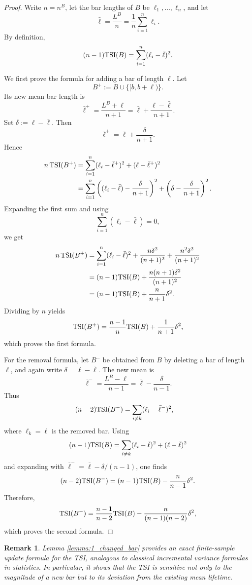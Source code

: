 \documentclass[11pt]{amsart}
\newtheorem*{remark}{Remark}
\theoremstyle{definition}
\newcommand{\tsi}[0]{\textup{TSI}}
\begin{document}
\begin{proof}
Write $n=n^B$, let the bar lengths of $B$ be $\ell_1,\dots,\ell_n$, and let
\[
\bar{\ell}=\frac{L^B}{n}=\frac{1}{n}\sum_{i=1}^n \ell_i.
\]
By definition,
\[
(n-1)\tsi(B)=\sum_{i=1}^n (\ell_i-\bar{\ell})^2.
\]

We first prove the formula for adding a bar of length $\ell$.
Let
\[
B^+:=B\cup\{[b,b+\ell)\}.
\]
Its new mean bar length is
\[
\bar{\ell}^+=\frac{L^B+\ell}{n+1}
=\bar{\ell}+\frac{\ell-\bar{\ell}}{n+1}.
\]
Set $\delta:=\ell-\bar{\ell}$. Then
\[
\bar{\ell}^+=\bar{\ell}+\frac{\delta}{n+1}.
\]
Hence
\begin{align*}
n\,\tsi(B^+)
&=\sum_{i=1}^n (\ell_i-\bar{\ell}^+)^2+(\ell-\bar{\ell}^+)^2\\
&=\sum_{i=1}^n \left((\ell_i-\bar{\ell})-\frac{\delta}{n+1}\right)^2
+\left(\delta-\frac{\delta}{n+1}\right)^2.
\end{align*}
Expanding the first sum and using
\[
\sum_{i=1}^n (\ell_i-\bar{\ell})=0,
\]
we get
\begin{align*}
n\,\tsi(B^+)
&=\sum_{i=1}^n (\ell_i-\bar{\ell})^2
+\frac{n\delta^2}{(n+1)^2}
+\frac{n^2\delta^2}{(n+1)^2}\\
&=(n-1)\tsi(B)+\frac{n(n+1)\delta^2}{(n+1)^2}\\
&=(n-1)\tsi(B)+\frac{n}{n+1}\delta^2.
\end{align*}
Dividing by \(n\) yields
\[
\tsi(B^+)
=\frac{n-1}{n}\tsi(B)+\frac{1}{n+1}\delta^2,
\]
which proves the first formula.

For the removal formula, let \(B^-\) be obtained from \(B\) by deleting a bar of length \(\ell\), and again write \(\delta=\ell-\bar{\ell}\).
The new mean is
\[
\bar{\ell}^-=\frac{L^B-\ell}{n-1}
=\bar{\ell}-\frac{\delta}{n-1}.
\]
Thus
\begin{align*}
(n-2)\tsi(B^-)
&=\sum_{i\neq k}(\ell_i-\bar{\ell}^-)^2,
\end{align*}
where \(\ell_k=\ell\) is the removed bar.
Using
\[
(n-1)\tsi(B)=\sum_{i\neq k}(\ell_i-\bar{\ell})^2+(\ell-\bar{\ell})^2
\]
and expanding with \(\bar{\ell}^-=\bar{\ell}-\delta/(n-1)\), one finds
\[
(n-2)\tsi(B^-)
=(n-1)\tsi(B)-\frac{n}{n-1}\delta^2.
\]
Therefore,
\[
\tsi(B^-)
=\frac{n-1}{n-2}\tsi(B)-\frac{n}{(n-1)(n-2)}\delta^2,
\]
which proves the second formula.
\end{proof}

\begin{remark}\rm
Lemma \ref{lemma:1_changed_bar} provides an exact finite-sample update formula for the TSI, analogous to classical incremental variance formulas in statistics. In particular, it shows that the TSI is sensitive not only to the magnitude of a new bar but to its deviation from the existing mean lifetime.
\end{remark}
\end{document}
